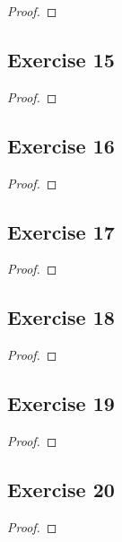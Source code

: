 \documentclass[14pt]{extarticle}
\begin{document}
\begin{proof}

\end{proof}

\subsection{Exercise 15}

\begin{proof}

\end{proof}

\subsection{Exercise 16}

\begin{proof}

\end{proof}

\subsection{Exercise 17}

\begin{proof}

\end{proof}

\subsection{Exercise 18}

\begin{proof}

\end{proof}

\subsection{Exercise 19}

\begin{proof}

\end{proof}

\subsection{Exercise 20}

\begin{proof}

\end{proof}
\end{document}
